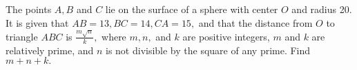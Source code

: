 The points $A, B$ and $C$ lie on the surface of a sphere with center $O$ and radius 20.  It is given that $AB=13, BC=14, CA=15,$ and that the distance from $O$ to triangle $ABC$ is $\frac{m\sqrt{n}}k,$ where $m, n,$ and $k$ are positive integers, $m$ and $k$ are relatively prime, and $n$ is not divisible by the square of any prime.  Find $m+n+k.$